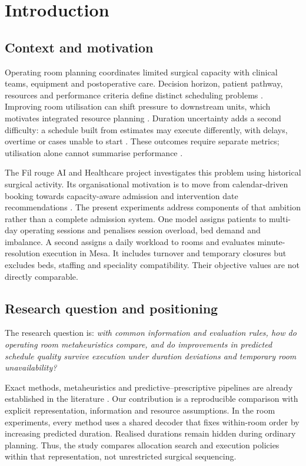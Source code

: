 \section{Introduction}
\label{sec:introduction}

\subsection{Context and motivation}

Operating room planning coordinates limited surgical capacity with clinical
teams, equipment and postoperative care. Decision horizon, patient pathway,
resources and performance criteria define distinct scheduling problems
\citep{cardoen2010,guerriero2011}. Improving room utilisation can shift pressure
to downstream units, which motivates integrated resource planning
\citep{rachuba2026}. Duration uncertainty adds a second difficulty: a schedule
built from estimates may execute differently, with delays, overtime or cases
unable to start \citep{denton2007}. These outcomes require separate metrics;
utilisation alone cannot summarise performance \citep{schouten2023}.

The Fil rouge AI and Healthcare project investigates this problem using
historical surgical activity. Its organisational motivation is to move from
calendar-driven booking towards capacity-aware admission and intervention
date recommendations \citep{group2026dataaudit}. The present experiments
address components of that ambition rather than a complete admission system.
One model assigns patients to multi-day operating sessions and penalises
session overload, bed demand and imbalance. A second assigns a daily workload
to rooms and evaluates minute-resolution execution in Mesa. It includes
turnover and temporary closures but excludes beds, staffing and speciality
compatibility. Their objective values are not directly comparable.

\subsection{Research question and positioning}

The research question is: \emph{with common information and evaluation rules,
how do operating room metaheuristics compare, and do improvements in predicted
schedule quality survive execution under duration deviations and temporary
room unavailability?}

Exact methods, metaheuristics and predictive--prescriptive pipelines are
already established in the literature \citep{fei2010,vieira2025,lex2025}.
Our contribution is a reproducible comparison with explicit representation,
information and resource assumptions. In the room experiments, every method
uses a shared decoder that fixes within-room order by increasing predicted
duration. Realised durations remain hidden during ordinary planning. Thus,
the study compares allocation search and execution policies within that
representation, not unrestricted surgical sequencing.

